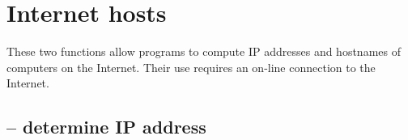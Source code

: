 









\section{Internet hosts}
These two functions allow programs to compute IP addresses and hostnames of computers on the Internet. Their use requires an on-line connection to the Internet.

\subsection{ -- determine IP address}
\label{misc:hosttoip}

